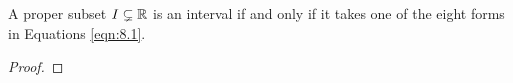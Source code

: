 \documentclass[../main.tex]{subfiles}
\begin{document}
\begin{lemma}\label{lem:8.3}
    A proper subset $I\subsetneq\mathbb{R}$ is an interval if and only if it takes one of the eight forms in Equations \ref{eqn:8.1}.
    \begin{proof}

        

        


\end{proof}
\end{lemma}
\end{document}
